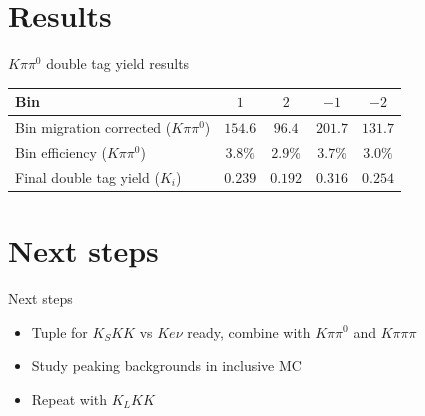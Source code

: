 \documentclass{beamer}
\begin{document}
\section{Results}
\begin{frame}{$K\pi\pi^0$ double tag yield results}
  \centering
  \def\arraystretch{1.2}%
  \begin{tabular}{l|cccc}
    \hline
    Bin & $1$    & $2$    & $-1$   & $-2$ \\
    \hline
    Bin migration corrected ($K\pi\pi^0$)  & $154.6$ & $96.4$  & $201.7$ & $131.7$ \\
    Bin efficiency ($K\pi\pi^0$)           & $3.8\%$ & $2.9\%$ & $3.7\%$ & $3.0\%$ \\
    Final double tag yield ($K_i$)         & $0.239$ & $0.192$ & $0.316$ & $0.254$ \\
    \hline
  \end{tabular}
\end{frame}

\section{Next steps}
\begin{frame}{Next steps}
  \begin{itemize}
    \setlength\itemsep{2em}
    \item{Tuple for $K_SKK$ vs $Ke\nu$ ready, combine with $K\pi\pi^0$ and $K\pi\pi\pi$}
    \item{Study peaking backgrounds in inclusive MC}
    \item{Repeat with $K_LKK$}
  \end{itemize}
\end{frame}
\end{document}
